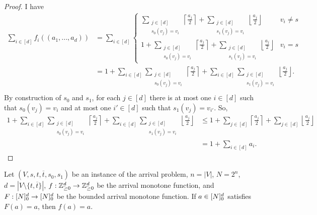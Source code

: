   \begin{proof}
    I have 
    \begin{align*}
      \sum_{i \in [d]} f_i ((a_1, ..., a_d)) &= \sum_{i \in [d]} \begin{cases}
    \sum_{\substack{j \in [d] \\ s_0(v_j) = v_i}} \left\lceil \frac{a_j}{2} \right\rceil
      + \sum_{\substack{j \in [d] \\ s_1(v_j) = v_i}} \left\lfloor \frac{a_j}{2} \right\rfloor
      & v_i \neq s \\
    1 + \sum_{\substack{j \in [d] \\ s_0(v_j) = v_i}} \left\lceil \frac{a_j}{2} \right\rceil
      + \sum_{\substack{j \in [d] \\ s_1(v_j) = v_i}} \left\lfloor \frac{a_j}{2} \right\rfloor
      & v_i = s 
    \end{cases}\\
        &= 1 + \sum_{i \in [d]} \sum_{\substack{j \in [d] \\ s_0(v_j) = v_i}}  \left\lceil \frac{a_j}{2} \right\rceil
      + \sum_{i \in [d]} \sum_{\substack{j \in [d] \\ s_1(v_j) = v_i}} \left\lfloor \frac{a_j}{2} \right\rfloor. \\
    \end{align*}
    By construction of $s_0$ and $s_1$, for each $j \in [d]$ there is at most one
    $i \in [d]$ such that $s_0(v_j) = v_i$ and at most one $i' \in [d]$ such that $s_1(v_j) = v_{i'}$.
    So,
    \begin{align*}
        1 + \sum_{i \in [d]} \sum_{\substack{j \in [d] \\ s_0(v_j) = v_i}}  \left\lceil \frac{a_j}{2} \right\rceil
      + \sum_{i \in [d]} \sum_{\substack{j \in [d] \\ s_1(v_j) = v_i}} \left\lfloor \frac{a_j}{2} \right\rfloor
      &\leq 1 + \sum_{j \in [d]} \left\lceil \frac{a_j}{2} \right\rceil + \sum_{j \in [d]} \left\lfloor \frac{a_j}{2} \right\rfloor \\
      &= 1 + \sum_{i \in [d]} a_i. 
    \end{align*}
  \end{proof}
  \begin{lemma}
    Let $(V, s, t, \overline{t}, s_0, s_1)$ be an instance of the arrival problem, 
    $n = |V|$, $N = 2^n$, $d = |V \setminus \{t, \overline{t}\}|$, 
    $f : \mathbb{Z}_{\geq 0}^d \to \mathbb{Z}_{\geq 0}^d$ be the arrival monotone function, and $F : [N]_0^d \to [N]_0^d$
    be the bounded arrival monotone function.
    If $a \in [N]_0^d$ satisfies $F(a) = a$, then $f(a) = a$. 
  \end{lemma}
